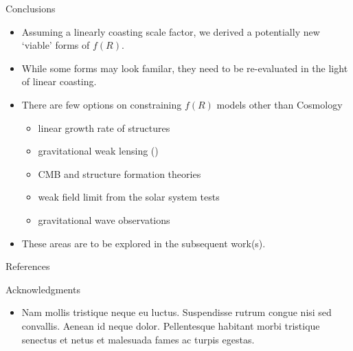 \documentclass[final,hyperref={pdfpagelabels=false}]{beamer}
\begin{document}
\begin{frame}[t]
\begin{columns}[t]
\begin{column}{.465\textwidth}
\begin{block}{Conclusions}
\begin{itemize}
\item Assuming a linearly coasting scale factor, we derived a potentially new `viable' forms of $f(R)$.
\item While some forms may look familar, they need to be re-evaluated in the light of linear coasting.
\item There are few options on constraining $f(R)$ models other than Cosmology
\begin{itemize}
	\item linear growth rate of structures
	\item gravitational weak lensing (\citet{tsujikawa2009dispersion})
	\item CMB and structure formation theories
	\item weak field limit from the solar system tests
	\item gravitational wave observations
\end{itemize}

\item These areas are to be explored in the subsequent work(s).
\end{itemize}

\end{block}


\begin{block}{References}
        
\nocite{*} %
\small{
}

\end{block}


\begin{block}{Acknowledgments}

\begin{itemize}
\item Nam mollis tristique neque eu luctus. Suspendisse rutrum congue nisi sed convallis. Aenean id neque dolor. Pellentesque habitant morbi tristique senectus et netus et malesuada fames ac turpis egestas.
\end{itemize}


\end{block}
\end{column}
\end{columns}
\end{frame}
\end{document}
